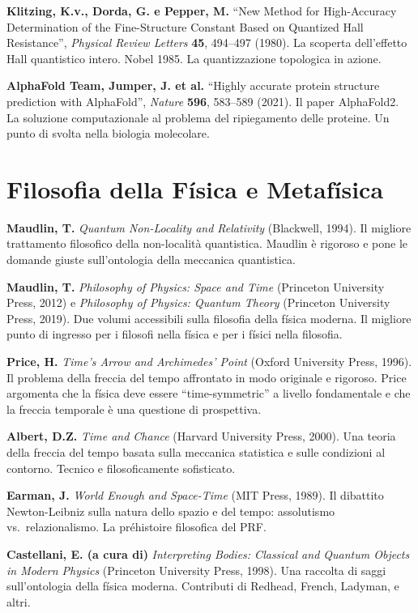 \documentclass[11.5pt,a4paper,openany]{book}
\theoremstyle{remark}
\begin{document}
\textbf{Klitzing, K.v., Dorda, G. e Pepper, M.} ``New Method for High-Accuracy Determination of the Fine-Structure Constant Based on Quantized Hall Resistance'', \textit{Physical Review Letters} \textbf{45}, 494--497 (1980). La scoperta dell'effetto Hall quantistico intero. Nobel 1985. La quantizzazione topologica in azione.

\textbf{AlphaFold Team, Jumper, J. et al.} ``Highly accurate protein structure prediction with AlphaFold'', \textit{Nature} \textbf{596}, 583--589 (2021). Il paper AlphaFold2. La soluzione computazionale al problema del ripiegamento delle proteine. Un punto di svolta nella biologia molecolare.

\section{Filosofia della Física e Metafísica}

\textbf{Maudlin, T.} \textit{Quantum Non-Locality and Relativity} (Blackwell, 1994). Il migliore trattamento filosofico della non-località quantistica. Maudlin è rigoroso e pone le domande giuste sull'ontologia della meccanica quantistica.

\textbf{Maudlin, T.} \textit{Philosophy of Physics: Space and Time} (Princeton University Press, 2012) e \textit{Philosophy of Physics: Quantum Theory} (Princeton University Press, 2019). Due volumi accessibili sulla filosofia della física moderna. Il migliore punto di ingresso per i filosofi nella física e per i físici nella filosofia.

\textbf{Price, H.} \textit{Time's Arrow and Archimedes' Point} (Oxford University Press, 1996). Il problema della freccia del tempo affrontato in modo originale e rigoroso. Price argomenta che la física deve essere ``time-symmetric'' a livello fondamentale e che la freccia temporale è una questione di prospettiva.

\textbf{Albert, D.Z.} \textit{Time and Chance} (Harvard University Press, 2000). Una teoria della freccia del tempo basata sulla meccanica statistica e sulle condizioni al contorno. Tecnico e filosoficamente sofisticato.

\textbf{Earman, J.} \textit{World Enough and Space-Time} (MIT Press, 1989). Il dibattito Newton-Leibniz sulla natura dello spazio e del tempo: assolutismo vs.\ relazionalismo. La préhistoire filosofica del PRF.

\textbf{Castellani, E. (a cura di)} \textit{Interpreting Bodies: Classical and Quantum Objects in Modern Physics} (Princeton University Press, 1998). Una raccolta di saggi sull'ontologia della física moderna. Contributi di Redhead, French, Ladyman, e altri.
\end{document}
